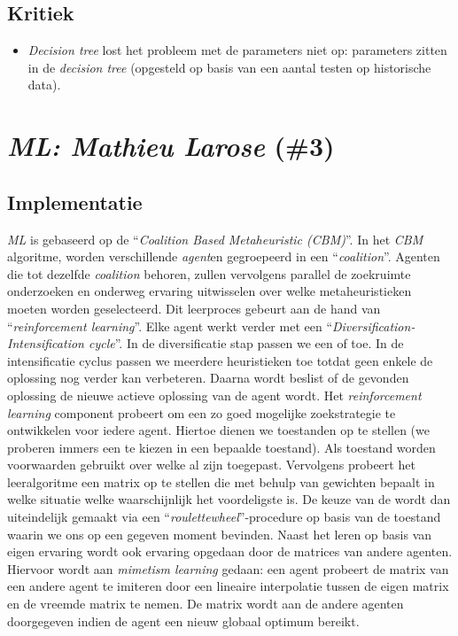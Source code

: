 \subsection{Kritiek}
\begin{itemize}
 \item \emph{Decision tree} lost het probleem met de parameters niet op: parameters zitten in de \emph{decision tree} (opgesteld op basis van een aantal testen op historische data).
\end{itemize}
\section{\emph{ML: Mathieu Larose} (\#3)}
\label{sss:ml}
\subsection{Implementatie}
\emph{ML}\cite{chesc-ml} is gebaseerd op de \abmh{} ``\emph{Coalition Based Metaheuristic (CBM)}''\cite{chesc-ml2}. In het \emph{CBM} algoritme, worden verschillende \emph{agent}en gegroepeerd in een ``\emph{coalition}''. Agenten die tot dezelfde \emph{coalition} behoren, zullen vervolgens parallel de zoekruimte onderzoeken en onderweg ervaring uitwisselen over welke metaheuristieken moeten worden geselecteerd. Dit leerproces gebeurt aan de hand van ``\emph{reinforcement learning}''\cite{rlaiacaml}. Elke agent werkt verder met een ``\emph{Diversification-Intensification cycle}''. In de diversificatie stap passen we een \abmt{} of \abrr{} \abllh{} toe. In de intensificatie cyclus passen we meerdere \abls{} heuristieken toe totdat geen enkele \abls{} \abh{} de oplossing nog verder kan verbeteren. Daarna wordt beslist of de gevonden oplossing de nieuwe actieve oplossing van de agent wordt. Het \emph{reinforcement learning} component probeert om een zo goed mogelijke zoekstrategie te ontwikkelen voor iedere agent. Hiertoe dienen we toestanden op te stellen (we proberen immers een \abh{} te kiezen in een bepaalde toestand). Als toestand worden voorwaarden gebruikt over welke \abllhn{} al zijn toegepast. Vervolgens probeert het leeralgoritme een matrix op te stellen die met behulp van gewichten bepaalt in welke situatie welke \abh{} waarschijnlijk het voordeligste is. De keuze van de \abh{} wordt dan uiteindelijk gemaakt via een ``\emph{roulettewheel}''-procedure\cite{DBLP:journals/corr/abs-1109-3627} op basis van de toestand waarin we ons op een gegeven moment bevinden. Naast het leren op basis van eigen ervaring wordt ook ervaring opgedaan door de matrices van andere agenten. Hiervoor wordt aan \emph{mimetism learning}\cite{655072} gedaan: een agent probeert de matrix van een andere agent te imiteren door een lineaire interpolatie tussen de eigen matrix en de vreemde matrix te nemen. De matrix wordt aan de andere agenten doorgegeven indien de agent een nieuw globaal optimum bereikt.
